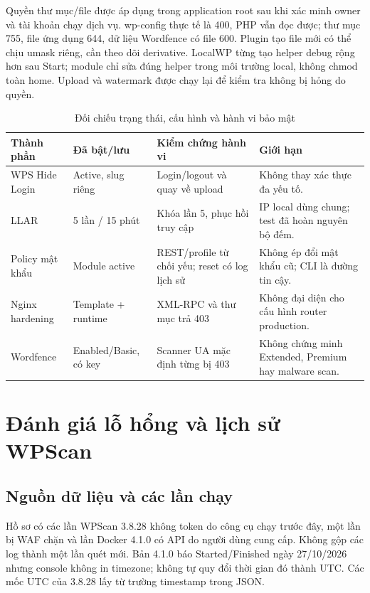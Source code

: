 Quyền thư mục/file được áp dụng trong application root sau khi xác minh owner và tài khoản chạy dịch vụ. wp-config thực tế là 400, PHP vẫn đọc được; thư mục 755, file ứng dụng 644, dữ liệu Wordfence có file 600. Plugin tạo file mới có thể chịu umask riêng, cần theo dõi derivative. LocalWP từng tạo helper debug rộng hơn sau Start; module chỉ sửa đúng helper trong môi trường local, không chmod toàn home. Upload và watermark được chạy lại để kiểm tra không bị hỏng do quyền.

\begin{table}[H]\centering\small
\caption{Đối chiếu trạng thái, cấu hình và hành vi bảo mật}
\begin{tabularx}{\linewidth}{lYYY}\toprule Thành phần & Đã bật/lưu & Kiểm chứng hành vi & Giới hạn\\\midrule
WPS Hide Login & Active, slug riêng & Login/logout và quay về upload & Không thay xác thực đa yếu tố.\\
LLAR & 5 lần / 15 phút & Khóa lần 5, phục hồi truy cập & IP local dùng chung; test đã hoàn nguyên bộ đếm.\\
Policy mật khẩu & Module active & REST/profile từ chối yếu; reset có log lịch sử & Không ép đổi mật khẩu cũ; CLI là đường tin cậy.\\
Nginx hardening & Template + runtime & XML-RPC và thư mục trả 403 & Không đại diện cho cấu hình router production.\\
Wordfence & Enabled/Basic, có key & Scanner UA mặc định từng bị 403 & Không chứng minh Extended, Premium hay malware scan.\\\bottomrule\end{tabularx}
\end{table}

\section{Đánh giá lỗ hổng và lịch sử WPScan}
\subsection{Nguồn dữ liệu và các lần chạy}
Hồ sơ có các lần WPScan 3.8.28 không token do công cụ chạy trước đây, một lần bị WAF chặn và lần Docker 4.1.0 có API do người dùng cung cấp. Không gộp các log thành một lần quét mới. Bản 4.1.0 báo Started/Finished ngày 27/10/2026 nhưng console không in timezone; không tự quy đổi thời gian đó thành UTC. Các mốc UTC của 3.8.28 lấy từ trường timestamp trong JSON.

